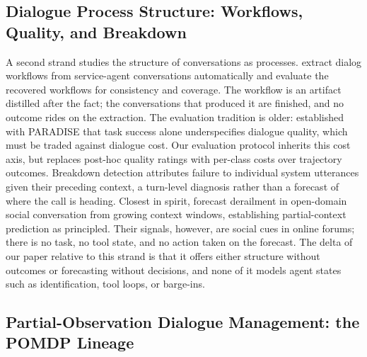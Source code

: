 \subsection{Dialogue Process Structure: Workflows, Quality, and Breakdown}

A second strand studies the structure of conversations as processes.
\citet{salesforce2025workflows} extract dialog workflows from service-agent conversations automatically and evaluate the recovered workflows for consistency and coverage.
The workflow is an artifact distilled after the fact; the conversations that produced it are finished, and no outcome rides on the extraction.
The evaluation tradition is older: \citet{walker1997paradise} established with PARADISE that task success alone underspecifies dialogue quality, which must be traded against dialogue cost.
Our evaluation protocol inherits this cost axis, but replaces post-hoc quality ratings with per-class costs over trajectory outcomes.
Breakdown detection \citep{higashinaka2016breakdown} attributes failure to individual system utterances given their preceding context, a turn-level diagnosis rather than a forecast of where the call is heading.
Closest in spirit, \citet{chang2019derailment} forecast derailment in open-domain social conversation from growing context windows, establishing partial-context prediction as principled.
Their signals, however, are social cues in online forums; there is no task, no tool state, and no action taken on the forecast.
The delta of our paper relative to this strand is that it offers either structure without outcomes or forecasting without decisions, and none of it models agent states such as identification, tool loops, or barge-ins.

\subsection{Partial-Observation Dialogue Management: the POMDP Lineage}


